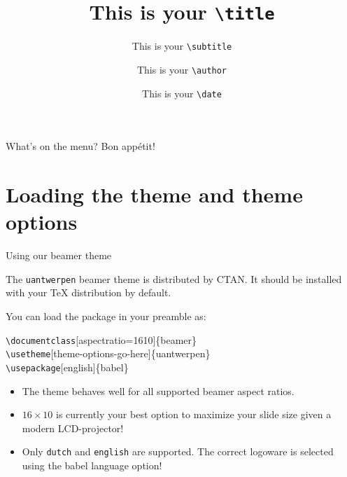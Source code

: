 \documentclass[aspectratio=1610]{beamer}
\title{This is your \texttt{\textbackslash{}title{}}}
\subtitle[my short title]{This is your \texttt{\textbackslash{}subtitle{}}}
\date[my short date]{This is your \texttt{\textbackslash{}date{}}}
\author[my short author]{This is your \texttt{\textbackslash{}author{}}}
\newcommand*\command[1]{{\tt \textbackslash #1}}
\begin{document}
\begin{frame}[negativefill]
  \maketitle
\end{frame}

\begin{frame}
  \maketitle
\end{frame}

\begin{frame}[negative]
  \maketitle
\end{frame}

\begin{frame}
  {What's on the menu?}
  {Bon app\'etit!}
  ~\\
  \tableofcontents
\end{frame}

\section{Loading the theme and theme options}

\begin{frame}[negative]
  \sectionpage
\end{frame}

\begin{frame}
  {Using our beamer theme}

  The \texttt{uantwerpen} beamer theme is distributed by CTAN. It
  should be installed with your \TeX{} distribution by default.

  You can load the package in your preamble as:

  \begin{codesnippet}
    \command{documentclass}[aspectratio=1610]\{beamer\}\\
    \command{usetheme}[theme-options-go-here]\{uantwerpen\}\\
    \command{usepackage}[english]\{babel\}
  \end{codesnippet}

  \begin{itemize}
  \item The theme behaves well for all supported beamer aspect
    ratios.
  \item $16\times 10$ is currently your best option to maximize your
    slide size given a modern LCD-projector!
  \item Only \texttt{dutch} and \texttt{english} are supported.
    The correct logoware is selected using the babel language option!
  \end{itemize}
\end{frame}
\end{document}
